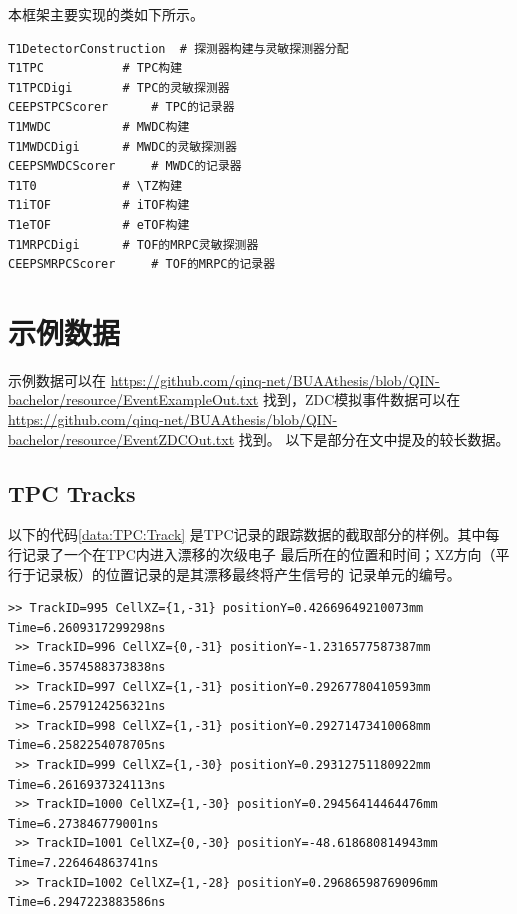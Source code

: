 \documentclass[bachelor,openany,oneside,color]{buaathesis}
\def\TZ{T\textsubscript{0}}
\begin{document}
本框架主要实现的类如下所示。

\begin{lstlisting}[caption={主要实现的类}]
T1DetectorConstruction	# 探测器构建与灵敏探测器分配
T1TPC			# TPC构建
T1TPCDigi		# TPC的灵敏探测器
CEEPSTPCScorer		# TPC的记录器
T1MWDC 			# MWDC构建
T1MWDCDigi		# MWDC的灵敏探测器
CEEPSMWDCScorer		# MWDC的记录器
T1T0			# \TZ构建
T1iTOF 			# iTOF构建
T1eTOF 			# eTOF构建
T1MRPCDigi 		# TOF的MRPC灵敏探测器
CEEPSMRPCScorer		# TOF的MRPC的记录器
\end{lstlisting}

\chapter{示例数据}\label{chap:data}

示例数据可以在
{\do{\/}\do{-}
\url{https://github.com/qinq-net/BUAAthesis/blob/QIN-bachelor/resource/EventExampleOut.txt}
}
找到，ZDC模拟事件数据可以在
{\do{\/}\do{-}
\url{https://github.com/qinq-net/BUAAthesis/blob/QIN-bachelor/resource/EventZDCOut.txt}
}
找到。
以下是部分在文中提及的较长数据。

\section{TPC Tracks}\label{sec:data:TPC:Track}

以下的代码\ref{data:TPC:Track}
是TPC记录的跟踪数据的截取部分的样例。其中每行记录了一个在TPC内进入漂移的次级电子
最后所在的位置和时间；XZ方向（平行于记录板）的位置记录的是其漂移最终将产生信号的
记录单元的编号。
\begin{lstlisting}[caption={TPC Tracks},label={data:TPC:Track},firstnumber=2650,lastline=2657]
 >> TrackID=995 CellXZ={1,-31} positionY=0.42669649210073mm Time=6.2609317299298ns
 >> TrackID=996 CellXZ={0,-31} positionY=-1.2316577587387mm Time=6.3574588373838ns
 >> TrackID=997 CellXZ={1,-31} positionY=0.29267780410593mm Time=6.2579124256321ns
 >> TrackID=998 CellXZ={1,-31} positionY=0.29271473410068mm Time=6.2582254078705ns
 >> TrackID=999 CellXZ={1,-30} positionY=0.29312751180922mm Time=6.2616937324113ns
 >> TrackID=1000 CellXZ={1,-30} positionY=0.29456414464476mm Time=6.273846779001ns
 >> TrackID=1001 CellXZ={0,-30} positionY=-48.618680814943mm Time=7.226464863741ns
 >> TrackID=1002 CellXZ={1,-28} positionY=0.29686598769096mm Time=6.2947223883586ns
\end{lstlisting}
\end{document}
